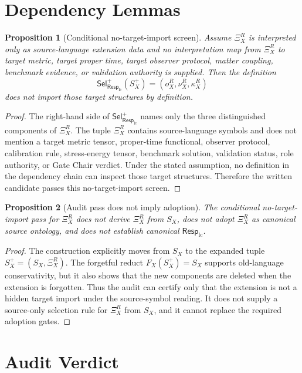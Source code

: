 \documentclass[11pt]{article}
\newcommand{\RespLC}{\mathsf{Resp}_{\mathrm{lc}}}
\newcommand{\SelResp}{\mathsf{Sel}_{\RespLC}}
\newcommand{\XiR}{\Xi_X^R}
\newcommand{\SX}{S_X}
\newcommand{\Splus}{S_X^+}
\newtheorem{proposition}{Proposition}
\begin{document}
\section{Dependency Lemmas}

\begin{proposition}[Conditional no-target-import screen]
Assume \(\XiR\) is interpreted only as source-language extension data
and no interpretation map from \(\XiR\) to target metric, target proper
time, target observer protocol, matter coupling, benchmark evidence, or
validation authority is supplied. Then the definition
\[
  \SelResp^{+}(\Splus)=(o_X^R,\nu_X^R,\kappa_X^R)
\]
does not import those target structures by definition.
\end{proposition}

\begin{proof}
The right-hand side of \(\SelResp^{+}\) names only the three
distinguished components of \(\XiR\). The tuple \(\XiR\) contains
source-language symbols and does not mention a target metric tensor,
proper-time functional, observer protocol, calibration rule,
stress-energy tensor, benchmark solution, validation status, role
authority, or Gate Chair verdict. Under the stated assumption, no
definition in the dependency chain can inspect those target structures.
Therefore the written candidate passes this no-target-import screen.
\end{proof}

\begin{proposition}[Audit pass does not imply adoption]
The conditional no-target-import pass for \(\XiR\) does not derive
\(\XiR\) from \(\SX\), does not adopt \(\XiR\) as canonical source
ontology, and does not establish canonical \(\RespLC\).
\end{proposition}

\begin{proof}
The construction explicitly moves from \(\SX\) to the expanded tuple
\(\Splus=(\SX,\XiR)\). The forgetful reduct \(F_X(\Splus)=\SX\)
supports old-language conservativity, but it also shows that the new
components are deleted when the extension is forgotten. Thus the audit
can certify only that the extension is not a hidden target import under
the source-symbol reading. It does not supply a source-only selection
rule for \(\XiR\) from \(\SX\), and it cannot replace the required
adoption gates.
\end{proof}

\section{Audit Verdict}
\end{document}
